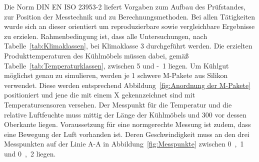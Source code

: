 Die Norm DIN EN ISO 23953-2 liefert Vorgaben zum Aufbau des Prüfstandes, zur Position der Messtechnik und zu Berechnungsmethoden. Bei allen Tätigkeiten wurde sich an dieser orientiert um reproduzierbare sowie vergleichbare Ergebnisse zu erzielen. Rahmenbedingung ist, dass alle Untersuchungen, nach Tabelle~\ref{tab:Klimaklassen}, bei Klimaklasse 3 durchgeführt werden. Die erzielten Produkttemperaturen des Kühlmöbels müssen dabei, gemäß Tabelle~\ref{tab:Temperaturklassen}, zwischen \unit{5}{\celsius} und \unit{-1}{\celsius} liegen.
Um Kühlgut möglichst genau zu simulieren, werden je \unit{1}{\kilogram} schwere M-Pakete aus Silikon verwendet.
Diese werden entsprechend Abbildung~\ref{fig:Anordnung der M-Pakete} positioniert und jene die mit einem X gekennzeichnet sind mit Temperatursensoren versehen.
Der Messpunkt für die Temperatur und die relative Luftfeuchte muss mittig der Länge der Kühlmöbels und \unit{300}{\milli\metre} vor dessen Oberkante liegen.
Voraussetzung für eine normgerechte Messung ist zudem, dass eine Bewegung der Luft vorhanden ist. Deren Geschwindigkeit muss an den drei Messpunkten auf der Linie A-A in Abbildung~\ref{fig:Messpunkte} zwischen \unit{0,1}{\meter\per\second} und \unit{0,2}{\meter\per\second} liegen\cite{DINDeutschesInstitutfurNormunge.V..}.








